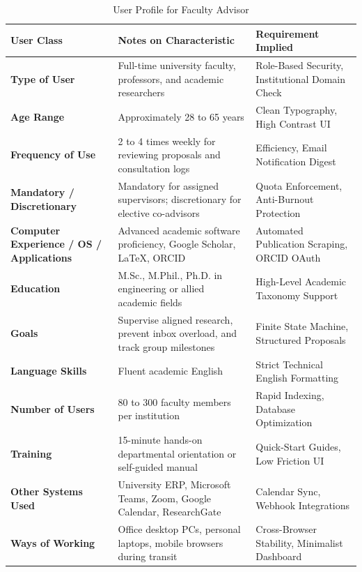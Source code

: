 \begin{table}[H]
\centering
\small
\begin{tabularx}{\textwidth}{|l|X|p{4.2cm}|}
\hline
\rowcolor{lightgray!40} \textbf{User Class} & \textbf{Notes on Characteristic} & \textbf{Requirement Implied} \\ \hline
\textbf{Type of User} & Full-time university faculty, professors, and academic researchers & Role-Based Security, Institutional Domain Check \\ \hline
\textbf{Age Range} & Approximately 28 to 65 years & Clean Typography, High Contrast UI \\ \hline
\textbf{Frequency of Use} & 2 to 4 times weekly for reviewing proposals and consultation logs & Efficiency, Email Notification Digest \\ \hline
\textbf{Mandatory / Discretionary} & Mandatory for assigned supervisors; discretionary for elective co-advisors & Quota Enforcement, Anti-Burnout Protection \\ \hline
\textbf{Computer Experience / OS / Applications} & Advanced academic software proficiency, Google Scholar, LaTeX, ORCID & Automated Publication Scraping, ORCID OAuth \\ \hline
\textbf{Education} & M.Sc., M.Phil., Ph.D. in engineering or allied academic fields & High-Level Academic Taxonomy Support \\ \hline
\textbf{Goals} & Supervise aligned research, prevent inbox overload, and track group milestones & Finite State Machine, Structured Proposals \\ \hline
\textbf{Language Skills} & Fluent academic English & Strict Technical English Formatting \\ \hline
\textbf{Number of Users} & 80 to 300 faculty members per institution & Rapid Indexing, Database Optimization \\ \hline
\textbf{Training} & 15-minute hands-on departmental orientation or self-guided manual & Quick-Start Guides, Low Friction UI \\ \hline
\textbf{Other Systems Used} & University ERP, Microsoft Teams, Zoom, Google Calendar, ResearchGate & Calendar Sync, Webhook Integrations \\ \hline
\textbf{Ways of Working} & Office desktop PCs, personal laptops, mobile browsers during transit & Cross-Browser Stability, Minimalist Dashboard \\ \hline
\end{tabularx}
\caption{User Profile for Faculty Advisor}
\label{tab:user_profile_faculty}
\end{table}

